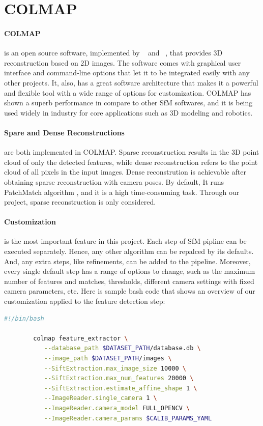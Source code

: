 \documentclass[11pt]{article}
\begin{document}
    \section{COLMAP}
    \paragraph{COLMAP} is an open source software, implemented by ~\cite{schoenberger2016sfm} and ~\cite{schoenberger2016mvs},
    that provides 3D reconstruction based on 2D images. The software comes with graphical user interface and
    command-line options that let it to be integrated easily with any other projects. It, also, has a great software
    architecture that makes it a powerful and flexible tool with a wide range of options for customization. COLMAP has
    shown a superb performance in compare to other SfM softwares, and it is being used widely in industry for
    core applications such as 3D modeling and robotics.

    \paragraph{Spare and Dense Reconstructions} are both implemented in COLMAP. Sparse reconstruction results in
    the 3D point cloud of only the detected features, while dense reconstruction refers to the point cloud of all
    pixels in the input images. Dense reconstrution is achievable after obtaining sparse reconstruction with camera
    poses. By default, It runs PatchMatch algorithm \cite{journals/tog/BarnesSFG09}, and it is a high time-consuming task.
    Through our project, sparse reconstruction is only considered.

    \paragraph{Customization} is the most important feature in this project. Each step of SfM pipline can be executed
    separately. Hence, any other algorithm can be repalced by its defaults. And, any extra steps, like refinements,
    can be added to the pipeline. Moreover, every single default step has a range of options to change, such as
    the maximum number of features and matches, thresholds, different camera settings with fixed camera parameters, etc.
    Here is sample bash code that shows an overview of our customization applied to the feature detection step:

    \begin{lstlisting}[language=bash,caption={colmapsparse.sh},label={lst:lstlisting2}]
        #!/bin/bash

        colmap feature_extractor \
           --database_path $DATASET_PATH/database.db \
           --image_path $DATASET_PATH/images \
           --SiftExtraction.max_image_size 10000 \
           --SiftExtraction.max_num_features 20000 \
           --SiftExtraction.estimate_affine_shape 1 \
           --ImageReader.single_camera 1 \
           --ImageReader.camera_model FULL_OPENCV \
           --ImageReader.camera_params $CALIB_PARAMS_YAML
    \end{lstlisting}
\end{document}
